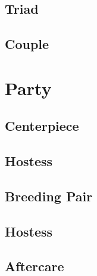 \documentclass[12pt,letterpaper,oneside]{memoir}
\begin{document}
  \chapter{Triad}
  

  \chapter{Couple}
  

  \part{Party}

  \chapter{Centerpiece}
  

  \chapter{Hostess}
  

  \chapter{Breeding Pair}
  

  \chapter{Hostess}
  

  \chapter{Aftercare}
  
\end{document}

